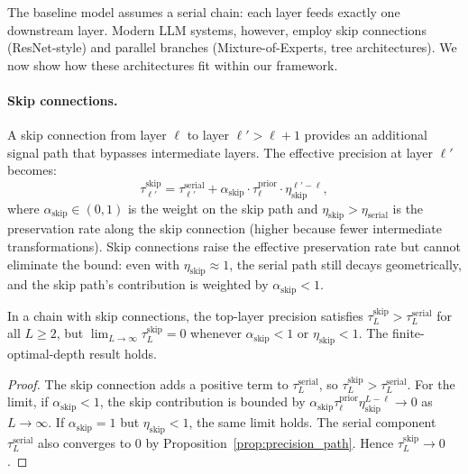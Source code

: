 The baseline model assumes a serial chain: each layer feeds exactly one downstream layer. Modern LLM systems, however, employ skip connections (ResNet-style) and parallel branches (Mixture-of-Experts, tree architectures). We now show how these architectures fit within our framework.

\paragraph{Skip connections.} A skip connection from layer $\ell$ to layer $\ell' > \ell+1$ provides an additional signal path that bypasses intermediate layers. The effective precision at layer $\ell'$ becomes:
\begin{equation}\label{eq:skip_precision}
\tau^{\text{skip}}_{\ell'} = \tau^{\text{serial}}_{\ell'} + \alpha_{\text{skip}} \cdot \tau^{\text{prior}}_\ell \cdot \eta_{\text{skip}}^{\ell' - \ell},
\end{equation}
where $\alpha_{\text{skip}} \in (0,1)$ is the weight on the skip path and $\eta_{\text{skip}} > \eta_{\text{serial}}$ is the preservation rate along the skip connection (higher because fewer intermediate transformations). Skip connections raise the effective preservation rate but cannot eliminate the bound: even with $\eta_{\text{skip}} \approx 1$, the serial path still decays geometrically, and the skip path's contribution is weighted by $\alpha_{\text{skip}} < 1$.

\begin{proposition}\label{prop:skip_connections}
In a chain with skip connections, the top-layer precision satisfies $\tau^{\text{skip}}_L > \tau^{\text{serial}}_L$ for all $L \geq 2$, but $\lim_{L \to \infty} \tau^{\text{skip}}_L = 0$ whenever $\alpha_{\text{skip}} < 1$ or $\eta_{\text{skip}} < 1$. The finite-optimal-depth result holds.
\end{proposition}

\begin{proof}
The skip connection adds a positive term to $\tau^{\text{serial}}_L$, so $\tau^{\text{skip}}_L > \tau^{\text{serial}}_L$. For the limit, if $\alpha_{\text{skip}} < 1$, the skip contribution is bounded by $\alpha_{\text{skip}} \tau^{\text{prior}}_\ell \eta_{\text{skip}}^{L-\ell} \to 0$ as $L \to \infty$. If $\alpha_{\text{skip}} = 1$ but $\eta_{\text{skip}} < 1$, the same limit holds. The serial component $\tau^{\text{serial}}_L$ also converges to 0 by Proposition~\ref{prop:precision_path}. Hence $\tau^{\text{skip}}_L \to 0$.
\end{proof}

